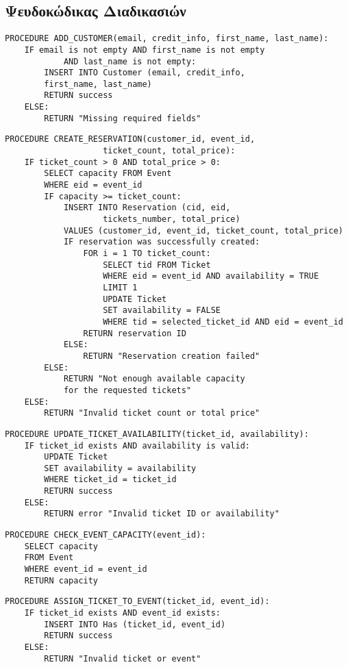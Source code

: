 \documentclass[a4paper, 11pt]{article}
\begin{document}
\subsection*{Ψευδοκώδικας Διαδικασιών}
\begin{verbatim}
PROCEDURE ADD_CUSTOMER(email, credit_info, first_name, last_name):
    IF email is not empty AND first_name is not empty 
    		AND last_name is not empty:
        INSERT INTO Customer (email, credit_info, 
        first_name, last_name)
        RETURN success
    ELSE:
        RETURN "Missing required fields"
\end{verbatim}
\begin{verbatim}
PROCEDURE CREATE_RESERVATION(customer_id, event_id, 
					ticket_count, total_price):
    IF ticket_count > 0 AND total_price > 0:
        SELECT capacity FROM Event
        WHERE eid = event_id
        IF capacity >= ticket_count:
            INSERT INTO Reservation (cid, eid, 
            		tickets_number, total_price)
            VALUES (customer_id, event_id, ticket_count, total_price)
            IF reservation was successfully created:
                FOR i = 1 TO ticket_count:
                    SELECT tid FROM Ticket
                    WHERE eid = event_id AND availability = TRUE
                    LIMIT 1
                    UPDATE Ticket
                    SET availability = FALSE
                    WHERE tid = selected_ticket_id AND eid = event_id
                RETURN reservation ID
            ELSE:
                RETURN "Reservation creation failed"
        ELSE:
            RETURN "Not enough available capacity 
            for the requested tickets"
    ELSE:
        RETURN "Invalid ticket count or total price"
\end{verbatim}
\begin{verbatim}
PROCEDURE UPDATE_TICKET_AVAILABILITY(ticket_id, availability):
    IF ticket_id exists AND availability is valid:
        UPDATE Ticket 
        SET availability = availability 
        WHERE ticket_id = ticket_id
        RETURN success
    ELSE:
        RETURN error "Invalid ticket ID or availability"
\end{verbatim}
\begin{verbatim}
PROCEDURE CHECK_EVENT_CAPACITY(event_id):
    SELECT capacity 
    FROM Event 
    WHERE event_id = event_id
    RETURN capacity
\end{verbatim} 
\begin{verbatim}
PROCEDURE ASSIGN_TICKET_TO_EVENT(ticket_id, event_id):
    IF ticket_id exists AND event_id exists:
        INSERT INTO Has (ticket_id, event_id)
        RETURN success
    ELSE:
        RETURN "Invalid ticket or event"
\end{verbatim}
\end{document}
